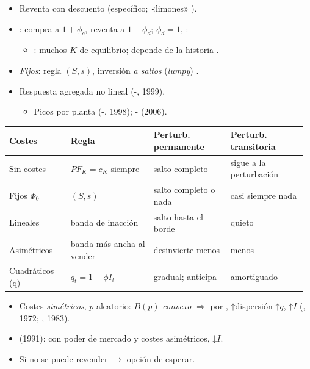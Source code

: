 \documentclass{article}
\begin{document}
\begin{columnas}
\begin{itemize}
\item Reventa con descuento (específico; «limones» ).
\item {}: compra a $1+\phi_c$, reventa a $1-\phi_d$; $\phi_d=1$, :
  \begin{itemize}
  \item {}: muchos $K$ de equilibrio; depende de la historia .
  \end{itemize}
\item \emph{Fijos}: regla $(S,s)$, inversión \emph{a saltos} (\emph{lumpy}) .
\item Respuesta agregada no lineal (-, 1999).
  \begin{itemize}
  \item Picos por planta (-, 1998); - (2006).
  \end{itemize}
\end{itemize}
{\centering\scriptsize\renewcommand{\arraystretch}{1.05}\setlength{\tabcolsep}{2pt}%
\begin{tabular}{@{}>{\raggedright\arraybackslash}p{0.2\linewidth}>{\raggedright\arraybackslash}p{0.27\linewidth}>{\raggedright\arraybackslash}p{0.25\linewidth}>{\raggedright\arraybackslash}p{0.25\linewidth}@{}}
\toprule
\rowcolor{tceeazulpalido}\textbf{Costes} & \textbf{Regla} & \textbf{Perturb. permanente} & \textbf{Perturb. transitoria}\\
\midrule
Sin costes & $PF_K=c_K$ siempre & salto completo & sigue a la perturbación\\
Fijos $\Phi_0$ & $(S,s)$ & salto completo o nada & casi siempre nada\\
Lineales & banda de inacción & salto hasta el borde & quieto\\
Asimétricos & banda más ancha al vender & desinvierte menos & menos\\
Cuadráticos (q) & $q_t=1+\phi I_t$ & gradual; anticipa & amortiguado\\
\bottomrule
\end{tabular}\par}

\begin{itemize}
\item Costes \emph{simétricos}, $p$ aleatorio: $B(p)$ \emph{convexo} $\Rightarrow$ por , ↑dispersión ↑$q$, ↑$I$ (, 1972; , 1983).
\item {} (1991): con poder de mercado y costes asimétricos, ↓$I$.
\item Si no se puede revender $\to$ opción de esperar.
\end{itemize}


\end{columnas}
\end{document}
